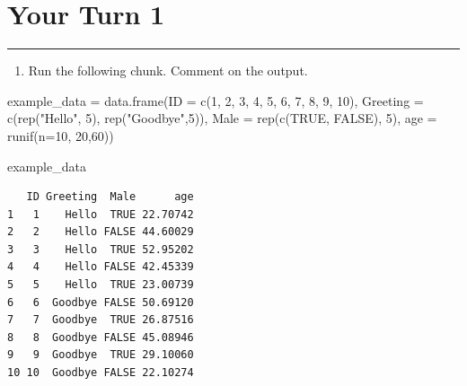 \documentclass[
]{book}
\newenvironment{Shaded}{\begin{snugshade}}{\end{snugshade}}
\newcommand{\AttributeTok}[1]{\textcolor[rgb]{0.77,0.63,0.00}{#1}}
\newcommand{\ConstantTok}[1]{\textcolor[rgb]{0.00,0.00,0.00}{#1}}
\newcommand{\DecValTok}[1]{\textcolor[rgb]{0.00,0.00,0.81}{#1}}
\newcommand{\FunctionTok}[1]{\textcolor[rgb]{0.00,0.00,0.00}{#1}}
\newcommand{\NormalTok}[1]{#1}
\newcommand{\OtherTok}[1]{\textcolor[rgb]{0.56,0.35,0.01}{#1}}
\newcommand{\StringTok}[1]{\textcolor[rgb]{0.31,0.60,0.02}{#1}}
\providecommand{\tightlist}{%
  \setlength{\itemsep}{0pt}\setlength{\parskip}{0pt}}
\begin{document}
\hypertarget{your-turn-1}{%
\section{Your Turn 1}\label{your-turn-1}}

\begin{center}\rule{0.5\linewidth}{0.5pt}\end{center}

\begin{enumerate}
\def\labelenumi{\alph{enumi}.}
\tightlist
\item
  Run the following chunk. Comment on the output.
\end{enumerate}

\begin{Shaded}
\begin{Highlighting}[]
\NormalTok{example\_data }\OtherTok{=} \FunctionTok{data.frame}\NormalTok{(}\AttributeTok{ID =} \FunctionTok{c}\NormalTok{(}\DecValTok{1}\NormalTok{, }\DecValTok{2}\NormalTok{, }\DecValTok{3}\NormalTok{, }\DecValTok{4}\NormalTok{, }\DecValTok{5}\NormalTok{, }\DecValTok{6}\NormalTok{, }\DecValTok{7}\NormalTok{, }\DecValTok{8}\NormalTok{, }\DecValTok{9}\NormalTok{, }\DecValTok{10}\NormalTok{),}
                          \AttributeTok{Greeting =} \FunctionTok{c}\NormalTok{(}\FunctionTok{rep}\NormalTok{(}\StringTok{"Hello"}\NormalTok{, }\DecValTok{5}\NormalTok{), }\FunctionTok{rep}\NormalTok{(}\StringTok{"Goodbye"}\NormalTok{,}\DecValTok{5}\NormalTok{)),}
                          \AttributeTok{Male =} \FunctionTok{rep}\NormalTok{(}\FunctionTok{c}\NormalTok{(}\ConstantTok{TRUE}\NormalTok{, }\ConstantTok{FALSE}\NormalTok{), }\DecValTok{5}\NormalTok{),}
                          \AttributeTok{age =} \FunctionTok{runif}\NormalTok{(}\AttributeTok{n=}\DecValTok{10}\NormalTok{, }\DecValTok{20}\NormalTok{,}\DecValTok{60}\NormalTok{))}

\NormalTok{example\_data}
\end{Highlighting}
\end{Shaded}

\begin{verbatim}
   ID Greeting  Male      age
1   1    Hello  TRUE 22.70742
2   2    Hello FALSE 44.60029
3   3    Hello  TRUE 52.95202
4   4    Hello FALSE 42.45339
5   5    Hello  TRUE 23.00739
6   6  Goodbye FALSE 50.69120
7   7  Goodbye  TRUE 26.87516
8   8  Goodbye FALSE 45.08946
9   9  Goodbye  TRUE 29.10060
10 10  Goodbye FALSE 22.10274
\end{verbatim}
\end{document}
